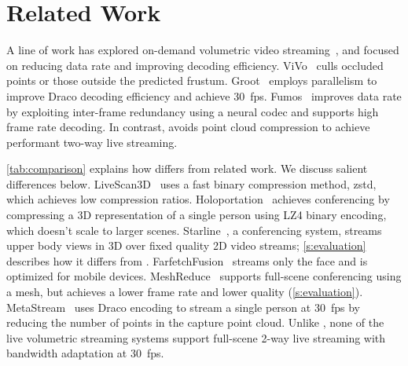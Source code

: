 \chapter{Related Work} \label{ch:related}

 A line of work has explored on-demand volumetric video streaming~\cite{vivo, groot, vues, yuzu, hermes, patchvvc}, and focused on reducing data rate and improving decoding efficiency. 
%
ViVo~\cite{vivo} culls occluded points or those outside the predicted frustum.
% 
Groot~\cite{groot} employs parallelism to improve Draco decoding efficiency and achieve 30~fps. 
%
Fumos~\cite{fumos} improves data rate by exploiting inter-frame redundancy using a neural codec and supports high frame rate decoding. 
%
In contrast, \livo avoids point cloud compression to achieve performant two-way live streaming.

%
\cref{tab:comparison} explains how \livo differs from related work. We discuss salient differences below.
%
LiveScan3D~\cite{livescan3d} uses a fast binary compression method, zstd, which achieves low compression ratios.
%
%
%
Holoportation~\cite{holoportation} achieves conferencing by compressing a 3D representation of a single person using LZ4 binary encoding, which doesn't scale to larger scenes.
%
Starline~\cite{starline}, a conferencing system, streams upper body views in 3D over fixed quality 2D video streams; \cref{s:evaluation} describes how it differs from \livo.
%
FarfetchFusion~\cite{farfetchfusion} streams only the face and is optimized for mobile devices.
%
MeshReduce~\cite{meshreduce} supports full-scene conferencing using a mesh, but achieves a lower frame rate and lower quality (\cref{s:evaluation}).
%
MetaStream~\cite{metastream} uses Draco encoding to stream a single person at 30~fps by reducing the number of points in the capture point cloud. 
%
Unlike \livo, none of the live volumetric streaming systems support full-scene 2-way live streaming with bandwidth adaptation at 30~fps.

